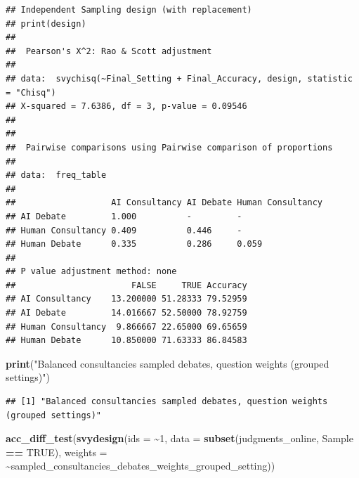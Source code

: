 \documentclass[
]{article}
\newenvironment{Shaded}{\begin{snugshade}}{\end{snugshade}}
\newcommand{\AttributeTok}[1]{\textcolor[rgb]{0.13,0.29,0.53}{#1}}
\newcommand{\ConstantTok}[1]{\textcolor[rgb]{0.56,0.35,0.01}{#1}}
\newcommand{\DecValTok}[1]{\textcolor[rgb]{0.00,0.00,0.81}{#1}}
\newcommand{\FunctionTok}[1]{\textcolor[rgb]{0.13,0.29,0.53}{\textbf{#1}}}
\newcommand{\NormalTok}[1]{#1}
\newcommand{\SpecialCharTok}[1]{\textcolor[rgb]{0.81,0.36,0.00}{\textbf{#1}}}
\newcommand{\StringTok}[1]{\textcolor[rgb]{0.31,0.60,0.02}{#1}}
\begin{document}
\begin{verbatim}
## Independent Sampling design (with replacement)
## print(design)
## 
##  Pearson's X^2: Rao & Scott adjustment
## 
## data:  svychisq(~Final_Setting + Final_Accuracy, design, statistic = "Chisq")
## X-squared = 7.6386, df = 3, p-value = 0.09546
## 
## 
##  Pairwise comparisons using Pairwise comparison of proportions 
## 
## data:  freq_table 
## 
##                   AI Consultancy AI Debate Human Consultancy
## AI Debate         1.000          -         -                
## Human Consultancy 0.409          0.446     -                
## Human Debate      0.335          0.286     0.059            
## 
## P value adjustment method: none 
##                       FALSE     TRUE Accuracy
## AI Consultancy    13.200000 51.28333 79.52959
## AI Debate         14.016667 52.50000 78.92759
## Human Consultancy  9.866667 22.65000 69.65659
## Human Debate      10.850000 71.63333 86.84583
\end{verbatim}

\begin{Shaded}
\begin{Highlighting}[]
\FunctionTok{print}\NormalTok{(}\StringTok{"Balanced consultancies sampled debates, question weights (grouped settings)"}\NormalTok{)}
\end{Highlighting}
\end{Shaded}

\begin{verbatim}
## [1] "Balanced consultancies sampled debates, question weights (grouped settings)"
\end{verbatim}

\begin{Shaded}
\begin{Highlighting}[]
\FunctionTok{acc\_diff\_test}\NormalTok{(}\FunctionTok{svydesign}\NormalTok{(}\AttributeTok{ids =} \SpecialCharTok{\textasciitilde{}}\DecValTok{1}\NormalTok{, }\AttributeTok{data =} \FunctionTok{subset}\NormalTok{(judgments\_online, }\StringTok{\textasciigrave{}}\AttributeTok{Sample}\StringTok{\textasciigrave{}} \SpecialCharTok{==} \ConstantTok{TRUE}\NormalTok{), }\AttributeTok{weights =} \SpecialCharTok{\textasciitilde{}}\NormalTok{sampled\_consultancies\_debates\_weights\_grouped\_setting))}
\end{Highlighting}
\end{Shaded}
\end{document}
